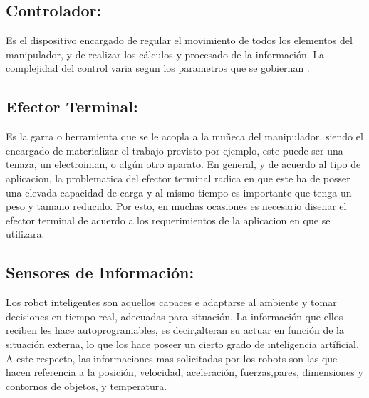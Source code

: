 \documentclass[14pt,a4paper]{article}
\begin{document}
\subsection{Controlador:}
Es el dispositivo encargado de regular el movimiento de todos los elementos del manipulador, y de realizar los cálculos y procesado de la información. La complejidad del control varia segun los parametros que se gobiernan \citep{cardenas2015diseno}.
\subsection{Efector Terminal:}
Es la garra o herramienta que se le acopla a la muñeca del manipulador, siendo el encargado de materializar el trabajo previsto por ejemplo, este puede ser una tenaza, un electroiman, o algún otro aparato. En general, y de acuerdo al tipo de aplicacion, la problematica del efector terminal radica en que este ha de posser una elevada capacidad de carga y al mismo tiempo es importante que tenga un peso y tamano reducido. Por esto, en muchas ocasiones es necesario disenar el efector terminal de acuerdo a los requerimientos de la aplicacion en que se utilizara.
\subsection{Sensores de Información:}
Los robot inteligentes son aquellos capaces e adaptarse al ambiente y tomar decisiones en tiempo real, adecuadas para situación. La información que ellos reciben les hace autoprogramables, es decir,alteran su actuar en función de la situación externa, lo que los hace poseer un cierto grado de inteligencia artíficial. A este respecto, las informaciones mas solicitadas por los robots son las que hacen referencia a la posición, velocidad, aceleración, fuerzas,pares, dimensiones y contornos de objetos, y temperatura.
\end{document}
